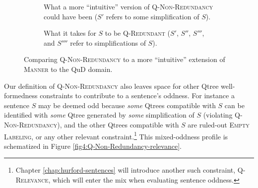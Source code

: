 \begin{figure}[H]
	\centering
	\begin{subfigure}[b]{.3\linewidth}
		\centering
		\caption[]{What a more ``intuitive'' version of \textsc{Q-Non-Redundancy} could have been ($S'$ refers to some simplification of $S$).}\label{fig4:redundancy-intuitive-extension}
	\end{subfigure}\hfill
	\begin{subfigure}[b]{.65\linewidth}
		\centering
		\caption[]{What it takes for $S$ to be \textsc{Q-Redundant} ($S'$, $S''$, $S'''$, and $S''''$ refer to simplifications of $S$).}\label{fig4:Q-Non-Redundancy}
	\end{subfigure}
	\caption[]{Comparing \textsc{Q-Non-Redundancy} to a more ``intuitive'' extension of \textsc{Manner} to the QuD domain.}
\end{figure}

Our definition of \textsc{Q-Non-Redundancy} also leaves space for other Qtree well-formedness constraints to contribute to a sentence's oddness. For instance a sentence $S$ may be deemed odd because \textit{some} Qtrees compatible with $S$ can be identified with \textit{some} Qtree generated by \textit{some} simplification of $S$ (violating \textsc{Q-Non-Redundancy}), and the other Qtrees compatible with $S$ are ruled-out \textsc{Empty Labeling}, or any other relevant constraint.\footnote{Chapter \ref{chap:hurford-sentences} will introduce another such constraint, \textsc{Q-Relevance}, which will enter the mix when evaluating sentence oddness.} This mixed-oddness profile is schematized in Figure \ref{fig4:Q-Non-Redundancy-relevance}.

